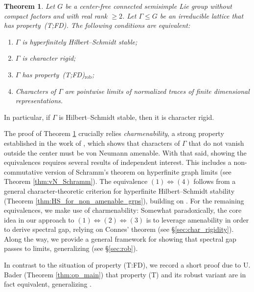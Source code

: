 \documentclass[11pt]{amsart}
\newtheorem{theorem}{Theorem}[section]
\theoremstyle{definition}
\theoremstyle{remark}
\theoremstyle{definition}
\begin{document}
\begin{theorem}\label{thm:main_char_rig_INTRO}
Let  $G$ be a center-free connected semisimple Lie group without compact factors and with real rank $\ge 2$.  Let $\Gamma\leq G$ be an irreducible lattice  that has property~\textnormal{(T;FD)}. The following conditions are equivalent:
\begin{enumerate}
   \item\label{it:hfstab} $\Gamma$ is hyperfinitely Hilbert--Schmidt stable;%
   \item\label{it:char} $\Gamma$ is character rigid;
   \item\label{it:tfdrob} $\Gamma$ has property~\textnormal{(T;FD)}$_{\mathrm{rob}}$;%
   \item\label{it:fdlimits} Characters of $\Gamma$ are pointwise limits of normalized traces of finite dimensional representations.
\end{enumerate}
\end{theorem}


In particular, if $\Gamma$ is Hilbert--Schmidt stable, then it is character rigid.

The proof of Theorem \ref{thm:main_char_rig_INTRO} crucially relies \emph{charmenability}, a strong property established in the work of \cite{BBHP}, which shows that characters of $\Gamma$ that do not vanish outside the center must be von Neumann amenable.
With that said, showing the equivalences requires several results of independent interest. This includes a non-commutative version of Schramm's theorem  \cite{Schramm}  on hyperfinite graph limits  (see Theorem \ref{thm:vN_Schramm}).
The equivalence $(1) \Leftrightarrow (4)$  follows from a general character-theoretic criterion for hyperfinite Hilbert--Schmidt stability (Theorem \ref{thm:HS_for_non_amenable_grps}), building on \cite{HS_grp}. 
For the remaining equivalences, we make use of charmenability:
Somewhat paradoxically, the core idea in our approach to $(1) \Leftrightarrow (2) \Leftrightarrow (3)$ is to leverage amenability in order to derive spectral gap, relying on Connes' theorem \cite{Connes} (see \S\ref{sec:char_rigidity}).
Along the way, we provide a general framework for showing that spectral gap passes to limits, generalizing \cite{levit2023spectral} (see \S\ref{sec:rob}).

In contrast to the situation of property (T:FD), we record a short proof due to U. Bader (Theorem \ref{thm:op_main}) that property (T) and its robust variant are in fact equivalent, generalizing \cite{Manuilov2007OnAR}.
\end{document}
